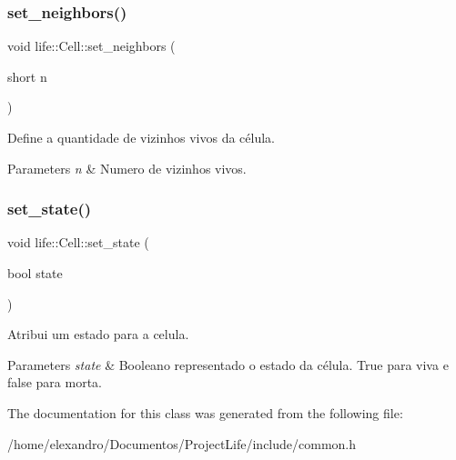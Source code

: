 \subsubsection{set\+\_\+neighbors()}
{\footnotesize\ttfamily void life\+::\+Cell\+::set\+\_\+neighbors (\begin{DoxyParamCaption}\item[{short}]{n }\end{DoxyParamCaption})\hspace{0.3cm}{\ttfamily [inline]}}

Define a quantidade de vizinhos vivos da célula. 
\begin{DoxyParams}{Parameters}
{\em n} & Numero de vizinhos vivos. \\
\hline
\end{DoxyParams}
\mbox{\label{classlife_1_1_cell_ae41c98886125c6cd720a1799f57ba9e1}} 
\subsubsection{set\+\_\+state()}
{\footnotesize\ttfamily void life\+::\+Cell\+::set\+\_\+state (\begin{DoxyParamCaption}\item[{bool}]{state }\end{DoxyParamCaption})\hspace{0.3cm}{\ttfamily [inline]}}

Atribui um estado para a celula. 
\begin{DoxyParams}{Parameters}
{\em state} & Booleano representado o estado da célula. True para viva e false para morta. \\
\hline
\end{DoxyParams}


The documentation for this class was generated from the following file\+:\begin{DoxyCompactItemize}
\item 
/home/elexandro/\+Documentos/\+Project\+Life/include/common.\+h\end{DoxyCompactItemize}
